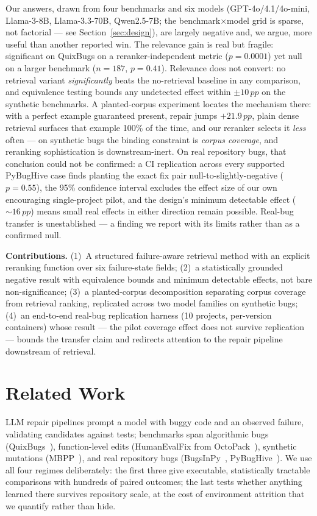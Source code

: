 \documentclass[10pt,conference]{IEEEtran}
\newcommand{\pp}{\,pp}
\begin{document}
Our answers, drawn from four benchmarks and six models
(GPT-4o/4.1/4o-mini, Llama-3-8B, Llama-3.3-70B, Qwen2.5-7B; the
benchmark$\times$model grid is sparse, not factorial --- see
Section~\ref{sec:design}), are largely negative and, we argue, more useful
than another reported win. The relevance gain is real but fragile:
significant on QuixBugs on a reranker-independent metric ($p{=}0.0001$) yet
null on a larger benchmark ($n{=}187$, $p{=}0.41$). Relevance does not
convert: no retrieval variant \emph{significantly} beats the no-retrieval
baseline in any comparison, and equivalence testing bounds any undetected
effect within $\pm 10\pp$ on the synthetic benchmarks. A planted-corpus
experiment locates the mechanism there: with a perfect example guaranteed
present, repair jumps $+21.9\pp$, plain dense retrieval surfaces that
example 100\% of the time, and our reranker selects it \emph{less} often
--- on synthetic bugs the binding constraint is \emph{corpus coverage},
and reranking sophistication is downstream-inert. On real repository bugs,
that conclusion could not be confirmed: a CI replication across every
supported PyBugHive case finds planting the exact fix pair
null-to-slightly-negative ($p{=}0.55$), the 95\% confidence interval
excludes the effect size of our own encouraging single-project pilot, and
the design's minimum detectable effect (${\sim}16\pp$) means small real
effects in either direction remain possible. Real-bug transfer is
unestablished --- a finding we report with its limits rather than as a
confirmed null.

\textbf{Contributions.} (1)~A structured failure-aware retrieval method
with an explicit reranking function over six failure-state fields; (2)~a
statistically grounded negative result with equivalence bounds and minimum
detectable effects, not bare non-significance; (3)~a planted-corpus
decomposition separating corpus coverage from retrieval ranking, replicated
across two model families on synthetic bugs; (4)~an end-to-end real-bug
replication harness (10 projects, per-version containers) whose result ---
the pilot coverage effect does not survive replication --- bounds the
transfer claim and redirects attention to the repair pipeline downstream of
retrieval.

\section{Related Work}
\label{sec:related}

LLM repair pipelines prompt a model with buggy code and an observed failure,
validating candidates against tests; benchmarks span algorithmic bugs
(QuixBugs~\cite{quixbugs}), function-level edits (HumanEvalFix from
OctoPack~\cite{octopack}), synthetic mutations (MBPP~\cite{mbpp}), and real
repository bugs (BugsInPy~\cite{bugsinpy}, PyBugHive~\cite{pybughive}). We
use all four regimes deliberately: the first three give executable,
statistically tractable comparisons with hundreds of paired outcomes; the
last tests whether anything learned there survives repository scale, at
the cost of environment attrition that we quantify rather than hide.
\end{document}
